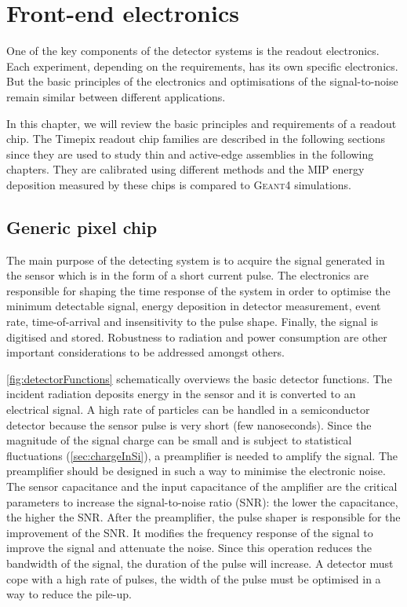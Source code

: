 \chapter{Front-end electronics}
\label{ch:FE_electronics}

One of the key components of the detector systems is the readout
electronics. Each experiment, depending on the requirements, has its
own specific electronics. But the basic principles of the electronics
and optimisations of the signal-to-noise remain similar between
different applications.

In this chapter, we will review the basic principles and requirements
of a readout chip. The Timepix readout chip families are described in
the following sections since they are used to study thin and
active-edge assemblies in the following chapters. They are calibrated
using different methods and the MIP energy deposition measured by
these chips is compared to \textsc{Geant4} simulations.

\section{Generic pixel chip}

The main purpose of the detecting system is to acquire the signal
generated in the sensor which is in the form of a short current
pulse. The electronics are responsible for shaping the time response
of the system in order to optimise the minimum detectable signal,
energy deposition in detector measurement, event rate, time-of-arrival
and insensitivity to the pulse shape. Finally, the signal is digitised
and stored. Robustness to radiation and power consumption are other
important considerations to be addressed amongst others.

\cref{fig:detectorFunctions} schematically overviews the basic
detector functions. The incident radiation deposits energy in the
sensor and it is converted to an electrical signal. A high rate of
particles can be handled in a semiconductor detector because the
sensor pulse is very short (few nanoseconds). Since the magnitude of
the signal charge can be small and is subject to statistical
fluctuations (\cref{sec:chargeInSi}), a preamplifier is needed to
amplify the signal. The preamplifier should be designed in such a way
to minimise the electronic noise. The sensor capacitance and the input
capacitance of the amplifier are the critical parameters to increase
the signal-to-noise ratio (SNR): the lower the capacitance, the higher
the SNR. After the preamplifier, the pulse shaper is responsible for the
improvement of the SNR. It modifies the frequency response of the
signal to improve the signal and attenuate the noise. Since this
operation reduces the bandwidth of the signal, the duration of the
pulse will increase. A detector must cope with a high rate of pulses,
the width of the pulse must be optimised in a way to reduce the
pile-up.

